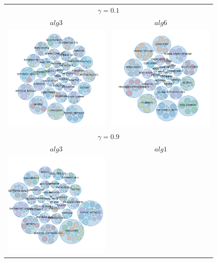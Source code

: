 \begin{figure}[H]
	\centering
	\begin{tabular}{cc}
		\multicolumn{2}{c}{$\gamma=0.1$}\vspace{0.5cm}\\
		$alg3$ & $alg6$\\
		\includegraphics[width=0.45\linewidth]{img/gamma-01-burbujas-alg-3.png}&
		\includegraphics[width=0.45\linewidth]{img/gamma-01-burbujas-alg-6.png}\vspace{1cm}\\
		\multicolumn{2}{c}{$\gamma=0.9$}\vspace{0.5cm}\\
		$alg3$ & $alg1$\\
		\includegraphics[width=0.45\linewidth]{img/gamma-09-burbujas-alg-3.png}&

\end{tabular}
\end{figure}
